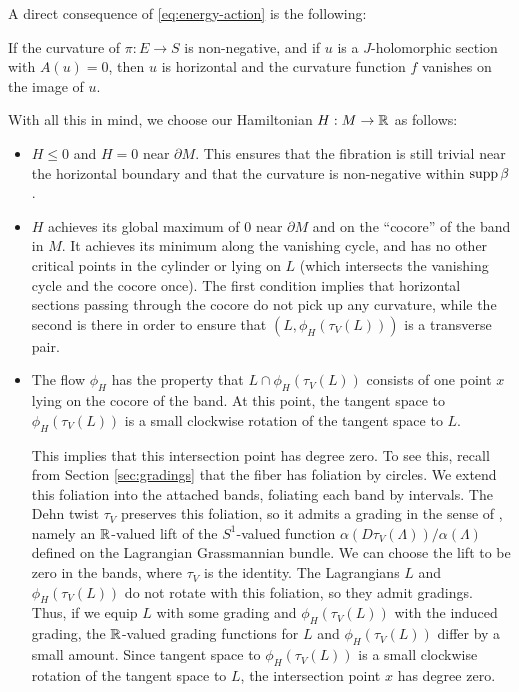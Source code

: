 \documentclass[12pt]{amsart}
\begin{document}
A direct consequence of \eqref{eq:energy-action} is the following:
\begin{proposition}
\label{prop:action-zero}
  If the curvature of $\pi: E \to S$ is non-negative, and if $u$ is a
  $J$-holomorphic section with $A(u) = 0$, then $u$ is horizontal
  and the curvature function $f$ vanishes on the image of $u$.
\end{proposition}

With all this in mind, we choose our Hamiltonian $H: M \to \mathbb{R}$ as
follows:
\begin{itemize}
\item $H \leq 0$ and $H = 0$ near $\partial M$. This ensures that the
  fibration is still trivial near the horizontal boundary and that the
  curvature is non-negative within $\operatorname{supp} \beta$.
\item $H$ achieves its global maximum of $0$ near $\partial M$ and on
  the ``cocore'' of the band in $M$. It achieves its minimum along the
  vanishing cycle, and has no other critical points in the cylinder or
  lying on $L$ (which intersects the vanishing cycle and the cocore
  once). The first condition implies that horizontal sections passing
  through the cocore do not pick up any curvature, while the second is
  there in order to ensure that $(L,\phi_H(\tau_V(L)))$ is a
  transverse pair.
\item The flow $\phi_H$ has the property that $L \cap
  \phi_H(\tau_V(L))$ consists of one point $x$ lying on the cocore of
  the band. At this point, the tangent space to $\phi_H(\tau_V(L))$ is a small clockwise rotation of the tangent space to $L$. 

This implies that this intersection point has degree zero. To see this, recall from Section \ref{sec:gradings} that the fiber has foliation by circles. We extend this foliation into the attached bands, foliating each band by intervals. The Dehn twist $\tau_V$ preserves this foliation, so it admits a grading in the sense of \cite[(12i)]{seidel-book}, namely an $\mathbb{R}$-valued lift of the $S^1$-valued function $\alpha(D\tau_V(\Lambda))/\alpha(\Lambda)$ defined on the Lagrangian Grassmannian bundle. We can choose the lift to be zero in the bands, where $\tau_V$ is the identity. The Lagrangians $L$ and $\phi_H(\tau_V(L))$ do not rotate with this foliation, so they admit gradings. Thus, if we equip $L$ with some grading and $\phi_H(\tau_V(L))$ with the induced grading, the $\mathbb{R}$-valued grading functions for $L$ and $\phi_H(\tau_V(L))$ differ by a small amount. Since tangent space to $\phi_H(\tau_V(L))$ is a small clockwise rotation of the tangent space to $L$, the intersection point $x$ has degree zero.
\end{itemize}
\end{document}
